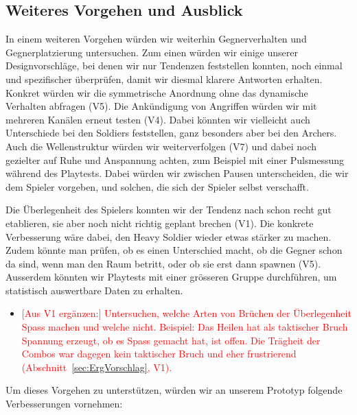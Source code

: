 \documentclass[../Main.tex]{subfiles}
\begin{document}
\subsection{Weiteres Vorgehen und Ausblick} \label{sec:Verbesserungen}

In einem weiteren Vorgehen würden wir weiterhin Gegnerverhalten und Gegnerplatzierung untersuchen. Zum einen würden wir einige unserer Designvorschläge, bei denen wir nur Tendenzen feststellen konnten, noch einmal und spezifischer überprüfen, damit wir diesmal klarere Antworten erhalten. Konkret würden wir die symmetrische Anordnung ohne das dynamische Verhalten abfragen (V5). Die Ankündigung von Angriffen würden wir mit mehreren Kanälen erneut testen (V4). Dabei könnten wir vielleicht auch Unterschiede bei den Soldiers feststellen, ganz besonders aber bei den Archers. Auch die Wellenstruktur würden wir weiterverfolgen (V7) und dabei noch gezielter auf Ruhe und Anspannung achten, zum Beispiel mit einer Pulsmessung während des Playtests.\autocite[285--287]{drachen2018gamesuserresearch} Dabei würden wir zwischen Pausen unterscheiden, die wir dem Spieler vorgeben, und solchen, die sich der Spieler selbst verschafft.

Die Überlegenheit des Spielers konnten wir der Tendenz nach schon recht gut etablieren, sie aber noch nicht richtig geplant brechen (V1). Die konkrete Verbesserung wäre dabei, den Heavy Soldier wieder etwas stärker zu machen. Zudem könnte man prüfen, ob es einen Unterschied macht, ob die Gegner schon da sind, wenn man den Raum betritt, oder ob sie erst dann spawnen (V5). Ausserdem könnten wir Playtests mit einer grösseren Gruppe durchführen, um statistisch auswertbare Daten zu erhalten.

\begin{itemize}[leftmargin=1.5cm]
    \item \textcolor{red}{[Aus V1 ergänzen:] Untersuchen, welche Arten von Brüchen der Überlegenheit Spass machen und welche nicht. Beispiel: Das Heilen hat als taktischer Bruch Spannung erzeugt, ob es Spass gemacht hat, ist offen. Die Trägheit der Combos war dagegen kein taktischer Bruch und eher frustrierend (Abschnitt~\ref{sec:ErgVorschlag}, V1).}
\end{itemize}

Um dieses Vorgehen zu unterstützen, würden wir an unserem Prototyp folgende Verbesserungen vornehmen:
\end{document}
